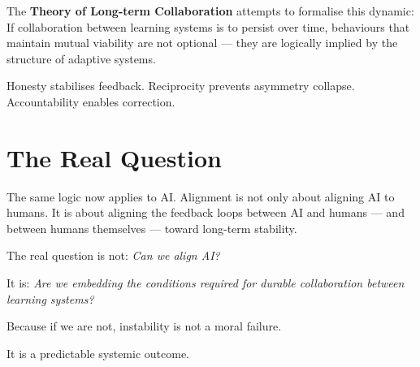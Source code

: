 \documentclass{article}
\begin{document}
The \textbf{Theory of Long-term Collaboration} attempts to formalise this dynamic:
If collaboration between learning systems is to persist over time, behaviours that maintain mutual viability are not optional — they are logically implied by the structure of adaptive systems.

Honesty stabilises feedback.
Reciprocity prevents asymmetry collapse.
Accountability enables correction.

\section*{The Real Question}

The same logic now applies to AI.
Alignment is not only about aligning AI to humans.
It is about aligning the feedback loops between AI and humans — and between humans themselves — toward long-term stability.

The real question is not:
\textit{Can we align AI?}

It is:
\textit{Are we embedding the conditions required for durable collaboration between learning systems?}

Because if we are not, instability is not a moral failure.

It is a predictable systemic outcome.
\end{document}
